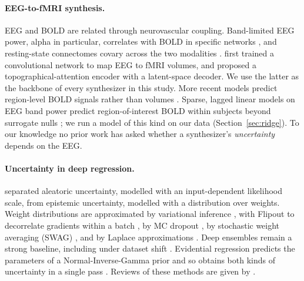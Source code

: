 \paragraph{EEG-to-fMRI synthesis.} EEG and BOLD are related through neurovascular coupling. Band-limited EEG power, alpha in particular, correlates with BOLD in specific networks \citep{goldman2002simultaneous,laufs2003eeg,mukamel2005coupling}, and resting-state connectomes covary across the two modalities \citep{deligianni2014relating}. \citet{liu2019convolutional} first trained a convolutional network to map EEG to fMRI volumes, and \citet{calhas2022eeg} proposed a topographical-attention encoder with a latent-space decoder. We use the latter as the backbone of every synthesizer in this study. More recent models predict region-level BOLD signals rather than volumes \citep{li2024neurobolt}. Sparse, lagged linear models on EEG band power predict region-of-interest BOLD within subjects beyond surrogate nulls \citep{mehta2025eegbold}; we run a model of this kind on our data (Section~\ref{sec:ridge}). To our knowledge no prior work has asked whether a synthesizer's \emph{uncertainty} depends on the EEG.

\paragraph{Uncertainty in deep regression.} \citet{kendall2017uncertainties} separated aleatoric uncertainty, modelled with an input-dependent likelihood scale, from epistemic uncertainty, modelled with a distribution over weights. Weight distributions are approximated by variational inference \citep{blundell2015weight}, with Flipout to decorrelate gradients within a batch \citep{wen2018flipout}, by MC dropout \citep{gal2016dropout}, by stochastic weight averaging (SWAG) \citep{maddox2019simple}, and by Laplace approximations \citep{daxberger2021laplace}. Deep ensembles \citep{lakshminarayanan2017simple} remain a strong baseline, including under dataset shift \citep{ovadia2019can}. Evidential regression predicts the parameters of a Normal-Inverse-Gamma prior and so obtains both kinds of uncertainty in a single pass \citep{amini2020deep}. Reviews of these methods are given by \citet{abdar2021review}.

